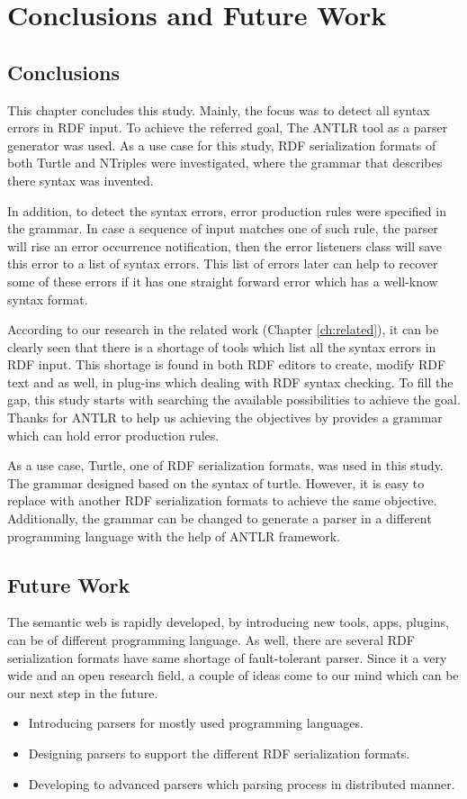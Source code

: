 \chapter{Conclusions and Future Work}
\label{ch:conclusions}

\section{Conclusions}
This chapter concludes this study. Mainly, the focus was to detect all syntax errors in RDF input. To achieve the referred goal, The ANTLR tool as a parser generator was used. As a use case for this study, RDF serialization formats of both Turtle and NTriples were investigated, where the grammar that describes there syntax was invented.

In addition, to detect the syntax errors, error production rules were specified in the grammar. In case a sequence of input matches one of such rule, the parser will rise an error occurrence notification, then the error listeners class will save this error to a list of syntax errors. This list of errors later can help to recover some of these errors if it has one straight forward error which has a well-know syntax format. 

According to our research in the related work (Chapter \ref{ch:related}), it can be clearly seen that there is a shortage of tools which list all the syntax errors in RDF input. This shortage is found in both RDF editors to create, modify RDF text and as well, in plug-ins which dealing with RDF syntax checking. To fill the gap, this study starts with searching the available possibilities to achieve the goal. Thanks for ANTLR to help us achieving the objectives by provides a grammar which can hold error production rules. 

As a use case, Turtle, one of RDF serialization formats, was used in this study. The grammar designed based on the syntax of turtle. However, it is easy to replace with another RDF serialization formats to achieve the same objective. Additionally, the grammar can be changed to generate a parser in a different programming language with the help of ANTLR framework.   


\section{Future Work}
The semantic web is rapidly developed, by introducing new tools, apps, plugins, can be of different programming language. As well, there are several RDF serialization  formats have same shortage of fault-tolerant parser. 
Since it a very wide and an open research field, a couple of ideas come to our mind which can be our next step in the future. 
\begin{itemize}
    \item Introducing parsers for mostly used programming languages. 
    \item Designing parsers to support the different RDF serialization formats.
    \item Developing to advanced parsers which parsing process in distributed manner.
\end{itemize}

